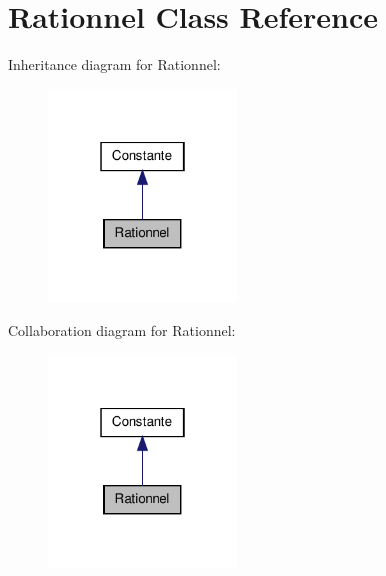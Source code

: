 \hypertarget{class_rationnel}{\section{\-Rationnel \-Class \-Reference}
\label{class_rationnel}
}


\-Inheritance diagram for \-Rationnel\-:
\nopagebreak
\begin{figure}[H]
\begin{center}
\leavevmode
\includegraphics[width=142pt]{class_rationnel__inherit__graph}
\end{center}
\end{figure}


\-Collaboration diagram for \-Rationnel\-:
\nopagebreak
\begin{figure}[H]
\begin{center}
\leavevmode
\includegraphics[width=142pt]{class_rationnel__coll__graph}
\end{center}
\end{figure}
